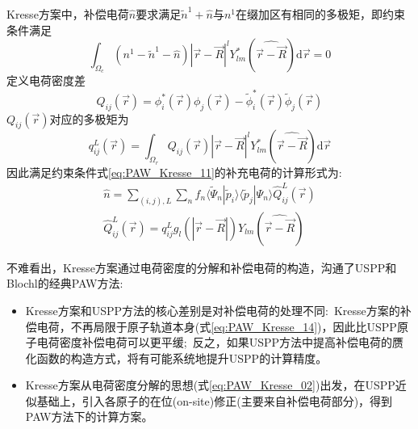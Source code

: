 \documentclass{article}      %
\begin{document}
\textrm{Kresse}方案中，补偿电荷$\hat n$要求满足$\tilde n^1+\hat n$与$n^1$在缀加区有相同的多极矩，即约束条件满足 
\begin{equation}
	\int_{\Omega_c}(n^1-\tilde n^1-\hat n)|\vec r-\vec R|^lY_{lm}^{\ast}(\widehat{\vec r-\vec R})\mathrm{d}\vec r=0
	\label{eq:PAW_Kresse_11}
\end{equation}
定义电荷密度差
\begin{equation}
	Q_{ij}(\vec r)=\phi_i^{\ast}(\vec r)\phi_j(\vec r)-\tilde\phi_i^{\ast}(\vec r)\tilde\phi_j(\vec r)
	\label{eq:PAW_Kresse_12}
\end{equation}
$Q_{ij}(\vec r)$对应的多极矩为
\begin{equation}
	q_{ij}^L(\vec r)=\int_{\Omega_r}Q_{ij}(\vec r)|\vec r-\vec R|^lY_{lm}^{\ast}(\widehat{\vec r-\vec R})\mathrm{d}\vec r
	\label{eq:PAW_Kresse_13}
\end{equation}
因此满足约束条件式\eqref{eq:PAW_Kresse_11}的补充电荷的计算形式为:~
\begin{equation}
	\begin{aligned}
		\hat n=\sum_{(i,j),L}\sum_n f_n\langle\tilde\Psi_n|\tilde p_i\rangle\langle\tilde p_j|\Psi_n\rangle\hat Q_{ij}^L(\vec r)\\
		\hat Q_{ij}^L(\vec r)=q_{ij}^Lg_l(|\vec r-\vec R|)Y_{lm}(\widehat{\vec r-\vec R})
	\end{aligned}
	\label{eq:PAW_Kresse_14}
\end{equation}

不难看出，\textrm{Kresse}方案通过电荷密度的分解和补偿电荷的构造，沟通了\textrm{USPP}和\textrm{Blochl}的经典\textrm{PAW}方法:
\begin{itemize}
	\item \textrm{Kresse}方案和\textrm{USPP}方法的核心差别是对补偿电荷的处理不同:~\textrm{Kresse}方案的补偿电荷，不再局限于原子轨道本身(式\eqref{eq:PAW_Kresse_14})，因此比\textrm{USPP}原子电荷密度补偿电荷可以更平缓;~反之，如果\textrm{USPP}方法中提高补偿电荷的赝化函数的构造方式，将有可能系统地提升\textrm{USPP}的计算精度。
	\item \textrm{Kresse}方案从电荷密度分解的思想(式\eqref{eq:PAW_Kresse_02})出发，在\textrm{USPP}近似基础上，引入各原子的在位(\textrm{on-site})修正(主要来自补偿电荷部分)，得到\textrm{PAW}方法下的计算方案。
\end{itemize}
\end{document}
